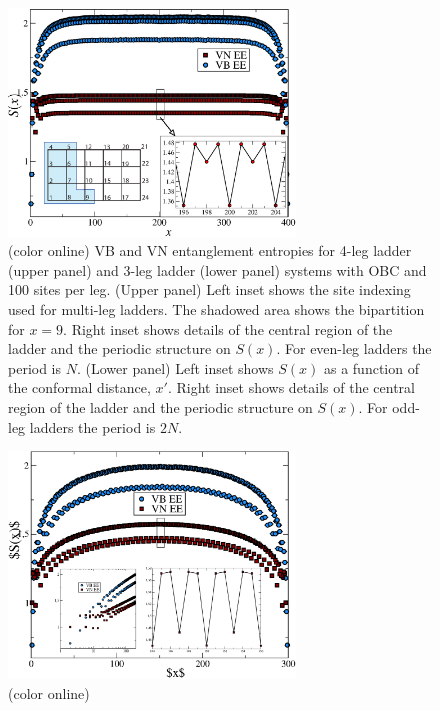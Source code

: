 \documentclass[prl,aps,twocolumn,floatfix,amsmath,amssymb,superscriptaddress,tightenlines]{revtex4}
\begin{document}
\begin{figure} { \includegraphics[width=3in]{FIG2.eps} \caption{(color
online) VB and VN entanglement entropies for 4-leg ladder (upper panel)
and 3-leg ladder (lower panel) systems with OBC and 100 sites per leg.
(Upper panel) Left inset shows the site indexing used for multi-leg
ladders. The shadowed area shows the bipartition for $x=9$. Right inset
shows details of the central region of the ladder and the periodic
structure on $S(x)$.  For even-leg ladders the period is $N$. (Lower
panel) Left inset shows $S(x)$ as a function of the conformal distance,
$x'$.  Right inset shows details of the central region of the ladder and
the periodic structure on $S(x)$. For odd-leg ladders the period is $2N$.
\label{ladder}}} \end{figure}

\begin{figure} {
\includegraphics[width=3in]{figure3/3-leg-ladder/fig3_final.eps} \caption{(color
online)  \label{odd-ladder}}} \end{figure}
\end{document}
